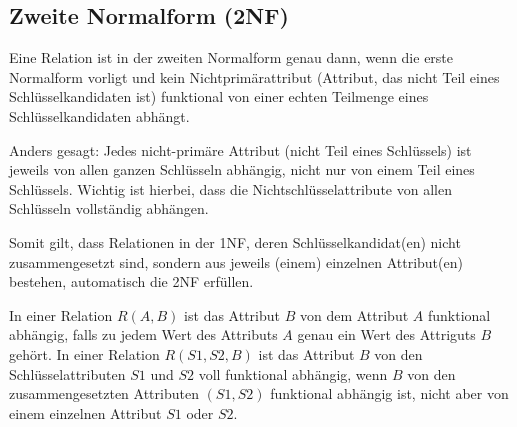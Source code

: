 \documentclass{scrbook}
\begin{document}
% 
% 
% 
% 
% 
% 







\subsection{Zweite Normalform (2NF)}

Eine Relation ist in der zweiten Normalform genau dann, wenn die erste
Normalform vorligt und kein Nichtprimärattribut (Attribut, das nicht Teil eines
Schlüsselkandidaten ist) funktional von einer echten Teilmenge eines
Schlüsselkandidaten abhängt.

Anders gesagt: Jedes nicht-primäre Attribut (nicht Teil eines Schlüssels)
ist jeweils von allen ganzen Schlüsseln abhängig, nicht nur von einem Teil eines Schlüssels.
Wichtig ist hierbei, dass die Nichtschlüsselattribute von allen Schlüsseln vollständig abhängen.

Somit gilt, dass Relationen in der 1NF, deren Schlüsselkandidat(en) nicht zusammengesetzt sind,
sondern aus jeweils (einem) einzelnen Attribut(en) bestehen, automatisch die 2NF erfüllen.

In einer Relation $R(A,B)$ ist das Attribut $B$ von dem Attribut $A$ funktional abhängig,
falls zu jedem Wert des Attributs $A$ genau ein Wert des Attriguts $B$ gehört.
In einer Relation $R(S1,S2,B)$ ist das Attribut $B$ von den Schlüsselattributen $S1$ und $S2$
voll funktional abhängig, wenn $B$ von den zusammengesetzten Attributen $(S1,S2)$ 
funktional abhängig ist, nicht aber von einem einzelnen Attribut $S1$ oder $S2$.
\end{document}
